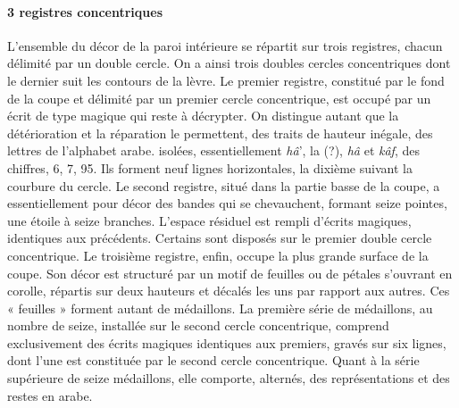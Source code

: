  \paragraph{3 registres concentriques}
L'ensemble du décor de la paroi intérieure se répartit sur trois registres, chacun délimité par un double cercle. On a ainsi trois doubles cercles concentriques dont le dernier suit les contours de la lèvre. 
Le premier registre, constitué par le fond de la coupe et délimité par un premier cercle concentrique, est occupé par un écrit de type magique qui reste à décrypter. On distingue autant que la détérioration et la réparation le permettent, des traits de hauteur inégale, des lettres de l'alphabet arabe. isolées, essentiellement \textit{hâ}', la (?), \textit{hâ} et \textit{kâf}, des chiffres, 6, 7, 95. Ils forment neuf lignes horizontales, la dixième suivant la courbure du cercle. Le second registre, situé dans la partie basse de la coupe, a essentiellement pour décor des bandes qui se chevauchent, formant seize pointes, une étoile à seize branches. L'espace résiduel est rempli d'écrits magiques, identiques aux précédents. Certains sont disposés sur le premier double cercle concentrique. Le troisième registre, enfin, occupe la plus grande surface de la coupe. Son décor est structuré par un motif de feuilles ou de pétales s'ouvrant en corolle, répartis sur deux hauteurs et décalés les uns par rapport aux autres. Ces « feuilles » forment autant de médaillons. La première série de médaillons, au nombre de seize, installée sur le second cercle concentrique, comprend exclusivement des écrits magiques identiques aux premiers, gravés sur six lignes, dont l'une est constituée par le second cercle concentrique. Quant à la série supérieure de seize médaillons, elle comporte, alternés, des représentations et des restes en arabe. 
